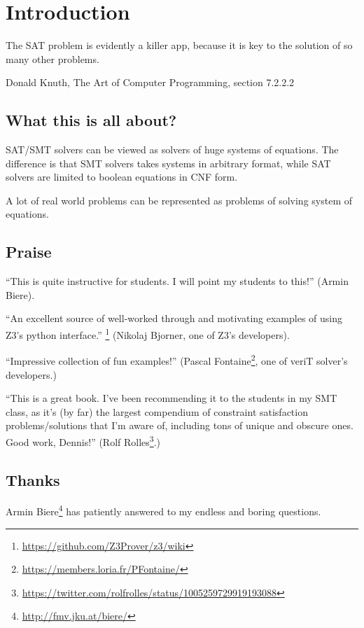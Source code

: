 \chapter{Introduction}

\epigraph{The SAT problem is evidently a killer app, because it is key to the solution of so many other problems.}
{Donald Knuth, The Art of Computer Programming, section 7.2.2.2}

\section{What this is all about?}

\ac{SAT}/\ac{SMT} solvers can be viewed as solvers of huge systems of equations.
The difference is that \ac{SMT} solvers takes systems in arbitrary format,
while \ac{SAT} solvers are limited to boolean equations in \ac{CNF} form.

A lot of real world problems can be represented as problems of solving system of equations.

\section{Praise}

``This is quite instructive for students. I will point my students to this!'' (Armin Biere).

``An excellent source of well-worked through and motivating examples of using Z3's python interface.''
\footnote{\url{https://github.com/Z3Prover/z3/wiki}}
(Nikolaj Bjorner, one of Z3's developers).

``Impressive collection of fun examples!''
(Pascal Fontaine\footnote{\url{https://members.loria.fr/PFontaine/}}, one of veriT solver's developers.)

``This is a great book. I've been recommending it to the students in my SMT class, as it's (by far) the largest compendium of constraint satisfaction problems/solutions that I'm aware of, including tons of unique and obscure ones. Good work, Dennis!''
(Rolf Rolles\footnote{\url{https://twitter.com/rolfrolles/status/1005259729919193088}}.)

\section{Thanks}

Armin Biere\footnote{\url{http://fmv.jku.at/biere/}} has patiently answered to my endless and boring questions.

